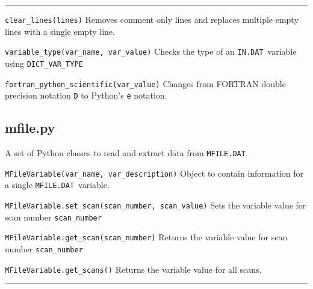 \documentclass[11pt,a4paper]{article}
\newcommand{\indat}{\mbox{\texttt{IN.DAT}}}
\newcommand{\mfile}{\mbox{\texttt{MFILE.DAT}}}
\begin{document}
\rule{\textwidth}{0.4pt}

\begin{description}

\item{\verb|clear_lines(lines)|} Removes comment only lines and replaces
  multiple empty lines with a single empty line.

\item{\verb|variable_type(var_name, var_value)|} Checks the type of an \indat\
  variable using \verb|DICT_VAR_TYPE|

\item{\verb|fortran_python_scientific(var_value)|} Changes from FORTRAN double
  precision notation \verb|D| to Python's \verb|e| notation.

\end{description}

\subsection{mfile.py}

A set of Python classes to read and extract data from \mfile.

\begin{description}

\item{\verb|MFileVariable(var_name, var_description)|} Object to contain
  information for a single \mfile\ variable.

\item{\verb|MFileVariable.set_scan(scan_number, scan_value)|} Sets the
  variable value for scan number \verb|scan_number|

\item{\verb|MFileVariable.get_scan(scan_number)|} Returns the variable value
  for scan number \verb|scan_number|

\item{\verb|MFileVariable.get_scans()|} Returns the variable value for all
  scans.

\end{description}

\rule{\textwidth}{0.4pt}
\end{document}
